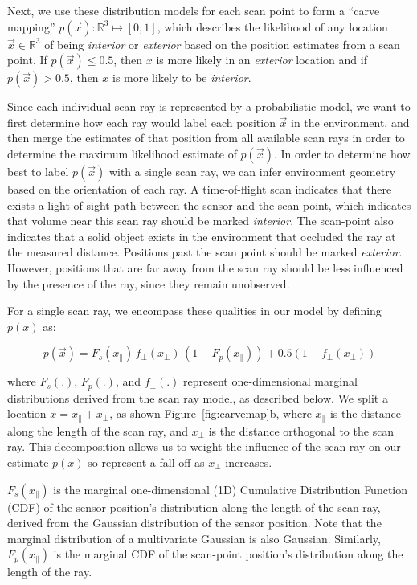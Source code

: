 \documentclass[12pt,onecolumn,oneside]{book}
\begin{document}
Next, we use these distribution models for each scan point to form a ``carve mapping'' $p(\vec{x}) : \mathbb{R}^3 \mapsto [0,1]$, which describes the likelihood of any location $\vec{x} \in \mathbb{R}^3$ of being {\it interior} or {\it exterior} based on the position estimates from a scan point.  If $p(\vec{x}) \leq 0.5$, then $x$ is more likely in an {\it exterior} location and if $p(\vec{x}) > 0.5$, then $x$ is more likely to be {\it interior}.  

Since each individual scan ray is represented by a probabilistic model, we want to first determine how each ray would label each position $\vec{x}$ in the environment, and then merge the estimates of that position from all available scan rays in order to determine the maximum likelihood estimate of $p(\vec{x})$.  In order to determine how best to label $p(\vec{x})$ with a single scan ray, we can infer environment geometry based on the orientation of each ray.  A time-of-flight scan indicates that there exists a light-of-sight path between the sensor and the scan-point, which indicates that volume near this scan ray should be marked {\it interior}.  The scan-point also indicates that a solid object exists in the environment that occluded the ray at the measured distance.  Positions past the scan point should be marked {\it exterior}.  However, positions that are far away from the scan ray should be less influenced by the presence of the ray, since they remain unobserved.  

For a single scan ray, we encompass these qualities in our model by defining $p(x)$ as:

\begin{equation}
	p(\vec{x}) = F_s(x_{\parallel}) \, f_{\perp}(x_{\perp}) \, (1 - F_p(x_{\parallel})) + 0.5 (1 - f_{\perp}(x_{\perp}))
	\label{eq:carvemap}
\end{equation}

where $F_s(.)$, $F_p(.)$, and $f_{\perp}(.)$ represent one-dimensional marginal distributions derived from the scan ray model, as described below.  We split a location $x = x_{\parallel} + x_{\perp}$, as shown Figure~\ref{fig:carvemap}b, where $x_{\parallel}$ is the distance along the length of the scan ray, and $x_{\perp}$ is the distance orthogonal to the scan ray.  This decomposition allows us to weight the influence of the scan ray on our estimate $p(x)$ so represent a fall-off as $x_{\perp}$ increases.

$F_s(x_{\parallel})$ is the marginal one-dimensional (1D) Cumulative Distribution Function (CDF) of the sensor position's distribution along the length of the scan ray, derived from the Gaussian distribution of the sensor position.  Note that the marginal distribution of a multivariate Gaussian is also Gaussian.  Similarly, $F_p(x_{\parallel})$ is the marginal CDF of the scan-point position's distribution along the length of the ray. 
\end{document}
